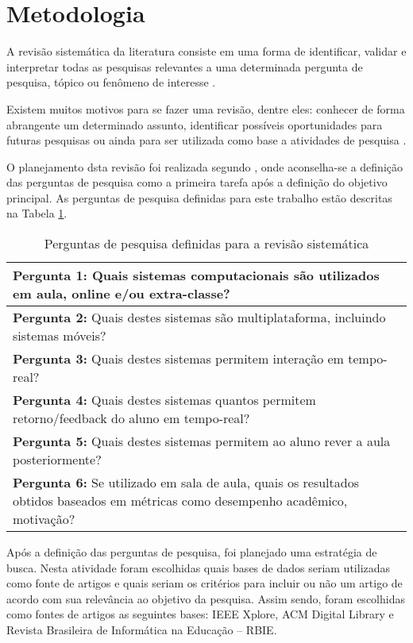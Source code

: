 \section{Metodologia}

A revisão sistemática da literatura consiste em uma forma de identificar, validar e interpretar todas as pesquisas relevantes a uma determinada pergunta de pesquisa, tópico ou fenômeno de interesse \cite{kitchenham:2004}. 

Existem muitos motivos para se fazer uma revisão, dentre eles: conhecer de forma abrangente um determinado assunto, identificar possíveis oportunidades para futuras pesquisas ou ainda para ser utilizada como base a atividades de pesquisa \cite{kitchenham:2004}. 

O planejamento dsta revisão foi realizada segundo \cite{kitchenham:2004}, onde aconselha-se a definição das perguntas de pesquisa como a primeira tarefa após a definição do objetivo principal. As perguntas de pesquisa definidas para este trabalho estão descritas na Tabela \ref{tab:perguntas}.

\bgroup
\def\arraystretch{1.5} %
\begin{table}[h]{} %
\centering
\begin{tabular}{|p{14cm}|} \hline
\textbf{Pergunta 1:} Quais sistemas computacionais são utilizados em aula, online e/ou extra-classe? \\ \hline
\textbf{Pergunta 2:} Quais destes sistemas são multiplataforma, incluindo sistemas móveis? \\ \hline
\textbf{Pergunta 3:} Quais destes sistemas permitem interação em tempo-real? \\ \hline
\textbf{Pergunta 4:} Quais destes sistemas quantos permitem retorno/feedback do aluno em tempo-real? \\ \hline
\textbf{Pergunta 5:} Quais destes sistemas permitem ao aluno rever a aula posteriormente? \\ \hline
\textbf{Pergunta 6:} Se utilizado em sala de aula, quais os resultados obtidos baseados em métricas como desempenho acadêmico, motivação? \\ \hline
\end{tabular}
\caption{Perguntas de pesquisa definidas para a revisão sistemática}
\label{tab:perguntas}
\end{table}
\egroup


Após a definição das perguntas de pesquisa, foi planejado uma estratégia de busca. Nesta atividade foram escolhidas quais bases de dados seriam utilizadas como fonte de artigos e quais seriam os critérios para incluir ou não um artigo de acordo com sua relevância ao objetivo da pesquisa. Assim sendo, foram escolhidas como fontes de artigos as seguintes bases: IEEE Xplore, ACM Digital Library e Revista Brasileira de Informática na Educação – RBIE.

